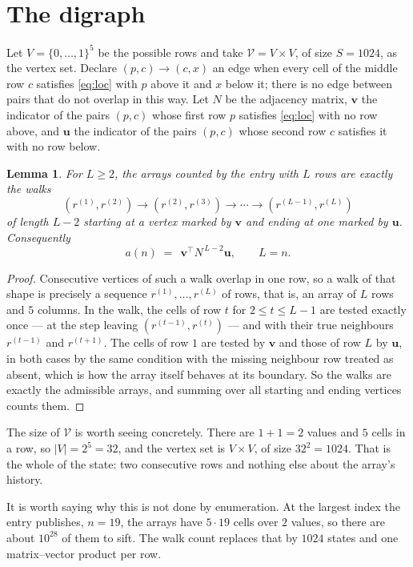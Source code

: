 \documentclass[11pt,a4paper]{article}
\theoremstyle{plain}
\newtheorem{lemma}[theorem]{Lemma}
\theoremstyle{definition}
\begin{document}
\section{The digraph}

Let $V=\{0,\dots,1\}^{5}$ be the possible rows and take
$\mathcal V=V\times V$, of size $S=1024$, as the vertex set. Declare $(p,c)\to(c,x)$ an edge
when every cell of the middle row $c$ satisfies \eqref{eq:loc} with $p$ above it and $x$
below it; there is no edge between pairs that do not overlap in this way. Let $N$ be the
adjacency matrix, $\mathbf{v}$ the indicator of the pairs $(p,c)$ whose first row $p$
satisfies \eqref{eq:loc} with no row above, and $\mathbf{u}$ the indicator of
the pairs $(p,c)$ whose second row $c$ satisfies it with no row below.

\begin{lemma}\label{lem:walk}
For $L\ge2$, the arrays counted by the entry with $L$ rows are exactly the walks
\[
(r^{(1)},r^{(2)})\to(r^{(2)},r^{(3)})\to\cdots\to(r^{(L-1)},r^{(L)})
\]
of length $L-2$ starting at a vertex marked by $\mathbf{v}$ and ending at one marked by
$\mathbf{u}$. Consequently
\[
a(n)\;=\;\,\mathbf{v}^{\!\top}N^{\,L-2}\mathbf{u},\qquad L=n .
\]
\end{lemma}

\begin{proof}
Consecutive vertices of such a walk overlap in one row, so a walk of that shape is
precisely a sequence $r^{(1)},\dots,r^{(L)}$ of rows, that is, an array of $L$ rows
and $5$ columns. In the walk, the cells of row $t$ for $2\le t\le L-1$ are tested
exactly once --- at the step leaving $(r^{(t-1)},r^{(t)})$ --- and with their true
neighbours $r^{(t-1)}$ and $r^{(t+1)}$. The cells of row $1$ are tested by
$\mathbf{v}$ and those of row $L$ by $\mathbf{u}$, in both cases by the same condition
with the missing neighbour row treated as absent, which is how the array itself behaves at
its boundary. So the walks are exactly the admissible arrays, and summing over all starting
and ending vertices counts them.
\end{proof}


The size of $\mathcal V$ is worth seeing concretely. There are $1+1=2$ values
and $5$ cells in a row, so $|V|=2^{5}=32$, and the vertex set is
$V\times V$, of size $32^2=1024$. That is the whole of the state: two consecutive
rows and nothing else about the array's history.

It is worth saying why this is not done by enumeration. At the largest index the entry
publishes, $n=19$, the arrays have $5\cdot19$ cells over
$2$ values, so there are about $10^{28}$ of them to sift. The
walk count replaces that by $1024$ states and one matrix--vector product per row.
\end{document}
